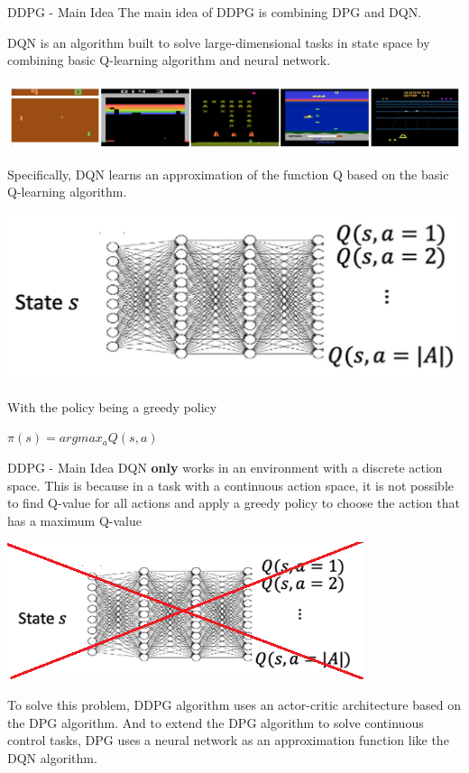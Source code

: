 \documentclass{beamer}
\begin{document}
\begin{frame}{DDPG - Main Idea}
The main idea of DDPG is combining DPG and DQN. \\
\vspace{0.2cm}
     
DQN is an algorithm built to solve large-dimensional tasks in state space by combining basic Q-learning algorithm and neural network.
\\
\begin{center}
     \includegraphics[scale=0.5]{Atarigame.png}
\end{center}
Specifically, DQN learns an approximation of the function Q based on the basic Q-learning algorithm.
 \begin{center}
        \includegraphics[scale=0.25]{net.jpg}
    \end{center}
With the policy being a greedy policy 
\begin{center}
    $\pi(s) = argmax_a Q(s,a)$
\end{center}
\end{frame}
\begin{frame}{DDPG - Main Idea}
DQN \textbf{only} works in an environment with a discrete action space. This is because in a task with a continuous action space, it is not possible to find Q-value for all actions and apply a greedy policy to choose the action that has a maximum Q-value
\begin{center}
    \includegraphics[scale=0.7]{Qoncontinuous.png}
\end{center}
\vspace{0.5cm}

\pause To solve this problem, DDPG algorithm uses an actor-critic architecture based on the DPG algorithm.
And to extend the DPG algorithm to solve continuous control tasks, DPG uses a neural network as an approximation function like the DQN algorithm. 
\end{frame}
\end{document}
